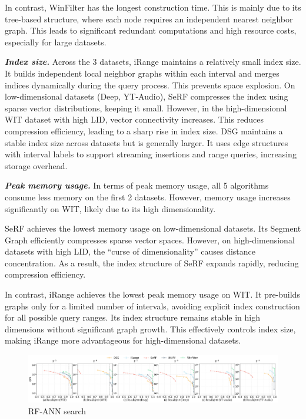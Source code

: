 \documentclass[sigconf, nonacm]{acmart}
\begin{document}
In contrast, WinFilter has the longest construction time. This is mainly due to its tree-based structure, where each node requires an independent nearest neighbor graph. This leads to significant redundant computations and high resource costs, especially for large datasets.






\textit{\textbf{Index size.}} Across the 3 datasets, iRange maintains a relatively small index size. It builds independent local neighbor graphs within each interval and merges indices dynamically during the query process. This prevents space explosion. On low-dimensional datasets (Deep, YT-Audio), SeRF compresses the index using sparse vector distributions, keeping it small. However, in the high-dimensional WIT dataset with high LID, vector connectivity increases. This reduces compression efficiency, leading to a sharp rise in index size. DSG maintains a stable index size across datasets but is generally larger. It uses edge structures with interval labels to support streaming insertions and range queries, increasing storage overhead.


\textit{\textbf{Peak memory usage.}}
In terms of peak memory usage, all 5 algorithms consume less memory on the first 2 datasets. However, memory usage increases significantly on WIT, likely due to its high dimensionality.

SeRF achieves the lowest memory usage on low-dimensional datasets. Its Segment Graph efficiently compresses sparse vector spaces. However, on high-dimensional datasets with high LID, the “curse of dimensionality” causes distance concentration. As a result, the index structure of SeRF expands rapidly, reducing compression efficiency.

In contrast, iRange achieves the lowest peak memory usage on WIT. It pre-builds graphs only for a limited number of intervals, avoiding explicit index construction for all possible query ranges. Its index structure remains stable in high dimensions without significant graph growth. This effectively controls index size, making iRange more advantageous for high-dimensional datasets.

\begin{figure}[htbp]
  \centering
  \includegraphics[width=\textwidth]{figures/exp/exp_8_2.pdf}
  \caption{RF-ANN search }
  \label{fig:exp_8_2}
\end{figure}
\end{document}
